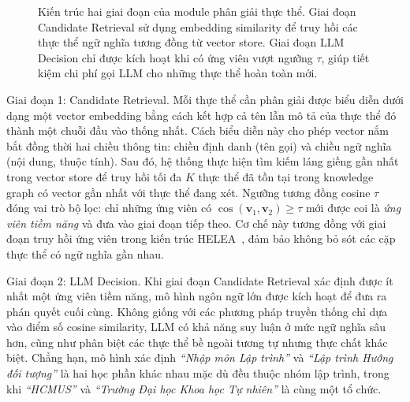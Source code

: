 \begin{figure}[H]
\caption{Kiến trúc hai giai đoạn của module phân giải thực thể.
Giai đoạn Candidate Retrieval sử dụng embedding similarity để truy hồi
các thực thể ngữ nghĩa tương đồng từ vector store. Giai đoạn LLM
Decision chỉ được kích hoạt khi có ứng viên vượt ngưỡng $\tau$,
giúp tiết kiệm chi phí gọi LLM cho những thực thể hoàn toàn mới.}
\label{fig:entity-resolution-flow}
\end{figure}

Giai đoạn 1: Candidate Retrieval.
Mỗi thực thể cần phân giải được biểu diễn dưới dạng một vector embedding bằng cách kết hợp cả tên lẫn
mô tả của thực thể đó thành một chuỗi đầu vào thống nhất. Cách biểu
diễn này cho phép vector nắm bắt đồng thời hai chiều thông tin: chiều
định danh (tên gọi) và chiều ngữ nghĩa (nội dung, thuộc tính). Sau đó,
hệ thống thực hiện tìm kiếm láng giềng gần nhất trong vector store để truy hồi tối đa $K$ thực thể đã
tồn tại trong knowledge graph có vector gần nhất với thực thể đang xét.
Ngưỡng tương đồng cosine $\tau$ đóng vai trò bộ lọc: chỉ những ứng
viên có $\cos(\mathbf{v}_1, \mathbf{v}_2) \geq \tau$ mới được coi là
\textit{ứng viên tiềm năng} và đưa vào giai đoạn tiếp theo. Cơ chế này tương đồng
với giai đoạn truy hồi ứng viên trong kiến trúc HELEA~\cite{helea2024},
đảm bảo không bỏ sót các cặp thực thể có ngữ nghĩa gần nhau.

Giai đoạn 2: LLM Decision.
Khi giai đoạn Candidate Retrieval xác định được ít nhất một ứng viên
tiềm năng, mô hình ngôn ngữ lớn được kích hoạt để đưa ra phán quyết
cuối cùng. Không giống với các phương pháp truyền thống chỉ dựa vào
điểm số cosine similarity, LLM có khả năng suy luận ở mức ngữ nghĩa
sâu hơn, cũng như phân biệt các thực thể bề ngoài tương tự
nhưng thực chất khác biệt. Chẳng hạn, mô hình xác định
\textit{``Nhập môn Lập trình''} và \textit{``Lập trình Hướng đối
tượng''} là hai học phần khác nhau mặc dù đều thuộc nhóm
lập trình, trong khi \textit{``HCMUS''} và \textit{``Trường Đại học
Khoa học Tự nhiên''} là cùng một tổ chức.
